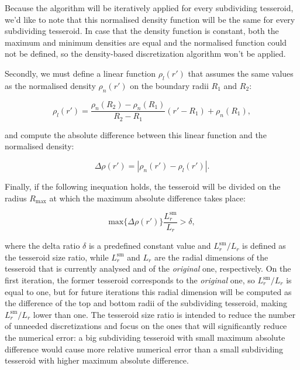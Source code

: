 \documentclass[extra]{gji}
\begin{document}
\noindent Because the algorithm will be iteratively applied for every
subdividing tesseroid, we'd like to note that this normalised density
function will be the same for every subdividing tesseroid.
In case that the density function is constant, both the maximum and
minimum densities are equal and the normalised function could not
be defined, so the density-based discretization algorithm won't be
applied.

Secondly, we must define a linear function $\rho_l(r')$ that assumes
the same values as the normalised density $\rho_n(r')$ on the boundary
radii $R_1$ and $R_2$:

\begin{equation}
    \rho_l(r') =
    \frac{ \rho_n(R_2) - \rho_n(R_1) }{ R_2 - R_1 } (r' - R_1) + \rho_n(R_1),
    \label{eq:density-reference-line}
\end{equation}

\noindent and compute the absolute difference between this linear
function and the normalised density:

\begin{equation}
    \Delta \rho (r') = | \rho_n(r') - \rho_l(r') |.
    \label{eq:density-abs-diff}
\end{equation}

Finally, if the following inequation holds, the tesseroid will be divided on
the radius $R_\text{max}$ at which the maximum absolute difference takes
place:

\begin{equation}
    \text{max}\{ \Delta \rho(r') \} \frac{L_r^\text{sm}}{L_r} > \delta,
    \label{eq:delta-density}
\end{equation}

\noindent where the delta ratio $\delta$ is a predefined constant value and
$L_r^\text{sm}/L_r$ is defined as the tesseroid size ratio, while
$L_r^\text{sm}$ and $L_r$ are the radial dimensions of the tesseroid that is
currently analysed and of the \emph{original} one, respectively.
On the first iteration, the former tesseroid corresponds to the
\emph{original} one, so $L_r^\text{sm}/L_r$ is equal to one, but for
future iterations this radial dimension will be computed as the
difference of the top and bottom radii of the subdividing tesseroid, making
$L_r^\text{sm}/L_r$ lower than one.
The tesseroid size ratio is intended to reduce the number of unneeded
discretizations and focus on the ones that will significantly reduce the
numerical error:
a big subdividing tesseroid with small maximum absolute difference would
cause more relative numerical error than a small subdividing tesseroid with
higher maximum absolute difference.
\end{document}
